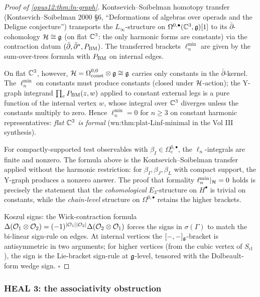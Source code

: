 \begin{proof}[Proof of \ref{opus12:thm:ln-graph}]
Kontsevich--Soibelman homotopy transfer (Kontsevich--Soibelman 2000
\S 6, ``Deformations of algebras over operads and the Deligne
conjecture'') transports the $L_\infty$-structure on
$\Omega^{0,\bullet}(\mathbb{C}^3, \mathfrak{g})[1]$ to its $\bar\partial$-cohomology
$\mathcal{H} \cong \mathfrak{g}$ (on flat $\mathbb{C}^3$: the only harmonic forms are
constants) via the contraction datum
$(\bar\partial, \bar\partial^*, P_{\mathrm{BM}})$. The transferred brackets
$\ell_n^{\min}$ are given by the sum-over-trees formula with
$P_{\mathrm{BM}}$ on internal edges.

On flat $\mathbb{C}^3$, however, $\mathcal{H} = \Omega^{0,0}_{\mathrm{const}} \otimes
\mathfrak{g} \cong \mathfrak{g}$ carries only constants in the $\bar\partial$-kernel. The
$\ell_n^{\min}$ on constants must produce constants (closed under
$\mathcal{H}$-action); the Y-graph integrand $\prod_e P_{\mathrm{BM}}(z, w)$ applied
to constant external legs is a pure function of the internal vertex
$w$, whose integral over $\mathbb{C}^3$ diverges unless the constants
multiply to zero. Hence $\ell_n^{\min} = 0$ for $n \ge 3$ on constant
harmonic representatives: \emph{flat $\mathbb{C}^3$ is formal}
(wn:thm:plat-Linf-minimal in the Vol III synthesis).

For compactly-supported test observables with $\beta_I \in
\Omega^{0,\bullet}_{\mathrm{c}}$, the $\ell_n$-integrals are finite
and nonzero. The formula above is the Kontsevich--Soibelman transfer
applied without the harmonic restriction: for $\beta_I, \beta_J, \beta_L$
with compact support, the Y-graph produces a nonzero answer. The
proof that formality
$\ell_n^{\min}|_{\mathcal{H}} = 0$ holds is precisely the statement that the
\emph{cohomological} $E_3$-structure on $H^\bullet$ is trivial on
constants, while the \emph{chain-level} structure on
$\Omega^{0,\bullet}$ retains the higher brackets.

Koszul signs: the Wick-contraction formula
$\Delta(\mathcal{O}_1 \otimes \mathcal{O}_2) = (-1)^{|\mathcal{O}_1||\mathcal{O}_2|}
\Delta(\mathcal{O}_2 \otimes \mathcal{O}_1)$ forces the signs in
$\sigma(\Gamma)$ to match the bi-linear sign-rule on edges. At
internal vertices the $[-, -]_{\mathfrak{g}}$-bracket is antisymmetric in two
arguments; for higher vertices (from the cubic vertex of
$S_{\mathrm{cl}}$), the sign is the Lie-bracket sign-rule at
$\mathfrak{g}$-level, tensored with the Dolbeault-form wedge sign. $\square$
\end{proof}

\subsubsection{HEAL 3: the associativity obstruction}

